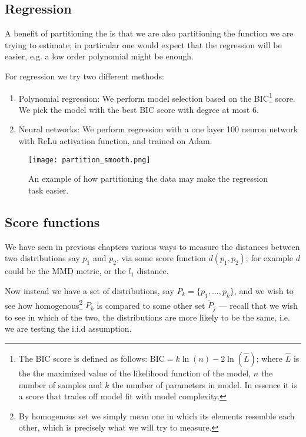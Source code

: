 \subsection{Regression}

A benefit of partitioning the is that we are also partitioning the function we are trying to estimate; in 
particular one would expect that the regression will be easier, e.g. a low order polynomial might be enough.

For regression we try two different methods:

\begin{enumerate}
    \item Polynomial regression: We perform model selection based on the BIC\footnote{
    The BIC score is defined as follows: $\mathrm{BIC} =k\ln(n)-2\ln({\widehat{L}})$; where $\widehat{L}$
    is the the maximized value of the likelihood function of the model, $n$ the number of samples and 
    $k$ the number of parameters in model. In essence it is a score that 
    trades off model fit with model complexity. } score. We pick the model with the 
    best BIC score with degree at most 6. 
    \item Neural networks: We perform regression with a one layer 100 neuron network with ReLu activation
    function, and trained on Adam.
\end{enumerate}

\begin{figure}[H]
    \centering
    \texttt{[image: partition\_smooth.png]}
    \caption{An example of how partitioning the data may make the regression task easier.}
\end{figure}


\subsection{Score functions}

We have seen in previous chapters various ways to measure the distances between two distributions say 
$p_1$ and $p_2$, via some score function $d(p_1, p_2)$; for example $d$ could be the 
MMD metric, or the $l_1$ distance.

Now instead we have a set of distributions, say $P_k = \{p_1, ..., p_k\}$, and we wish to see how homogenous\footnote{
    By homogenous set we simply mean one in which its elements resemble each other, which is precisely what we will try to measure. 
}
$P_k$ is compared to some other set $\tilde{P}_j$ ---  recall that we wish to see in which of the two, 
 the distributions are more likely to be the same, i.e. we are testing the i.i.d assumption. 

